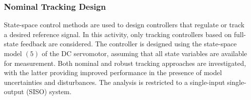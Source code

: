 \subsubsection{Nominal Tracking Design}
State-space control methods are used to design controllers that regulate or track a desired reference signal. In this activity, only tracking controllers based on full-state feedback are considered. The controller is designed using the state-space model $(5)$ of the DC servomotor, assuming that all state variables are available for measurement. Both nominal and robust tracking approaches are investigated, with the latter providing improved performance in the presence of model uncertainties and disturbances. The analysis is restricted to a single-input single-output (SISO) system.
